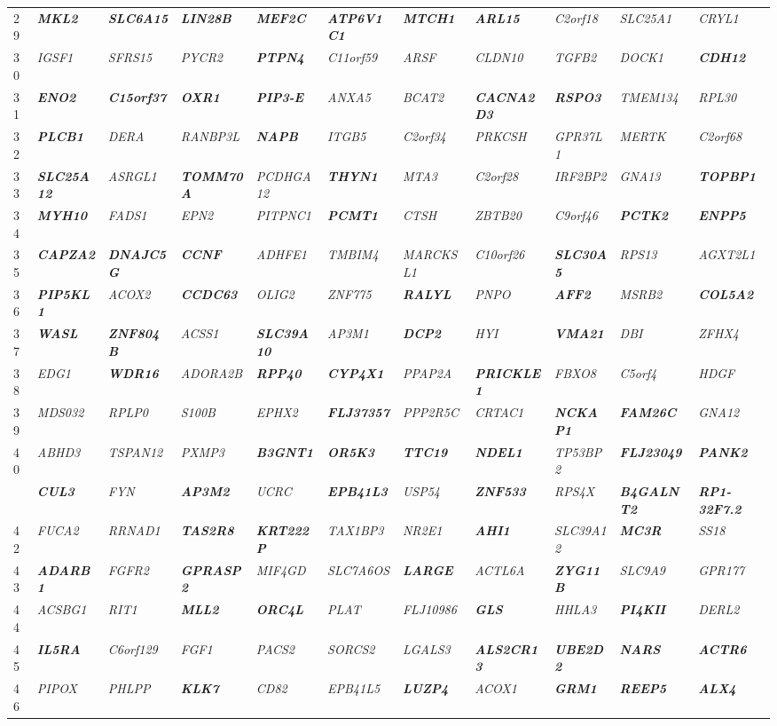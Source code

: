 \documentclass[letterpaper,12pt]{article}
\numberwithin{equation}{appendix}
\begin{document}
\begin{landscape}
{{\begin{longtable}{l >{\itshape}l >{\itshape}l >{\itshape}l >{\itshape}l >{\itshape}l >{\itshape}l >{\itshape}l >{\itshape}l >{\itshape}l >{\itshape}l}
29&{\bfseries {MKL2}}&{\bfseries {SLC6A15}}&{\bfseries {LIN28B}}&{\bfseries {MEF2C}}&{\bfseries {ATP6V1C1}}&{\bfseries {MTCH1}}&{\bfseries {ARL15}}&C2orf18&SLC25A1&CRYL1\tabularnewline
30&IGSF1&SFRS15&PYCR2&{\bfseries {PTPN4}}&C11orf59&ARSF&CLDN10&TGFB2&DOCK1&{\bfseries {CDH12}}\tabularnewline
31&{\bfseries {ENO2}}&{\bfseries {C15orf37}}&{\bfseries {OXR1}}&{\bfseries {PIP3-E}}&ANXA5&BCAT2&{\bfseries {CACNA2D3}}&{\bfseries {RSPO3}}&TMEM134&RPL30\tabularnewline
32&{\bfseries {PLCB1}}&DERA&RANBP3L&{\bfseries {NAPB}}&ITGB5&C2orf34&PRKCSH&GPR37L1&MERTK&C2orf68\tabularnewline
33&{\bfseries {SLC25A12}}&ASRGL1&{\bfseries {TOMM70A}}&PCDHGA12&{\bfseries {THYN1}}&MTA3&C2orf28&IRF2BP2&GNA13&{\bfseries {TOPBP1}}\tabularnewline
34&{\bfseries {MYH10}}&FADS1&EPN2&PITPNC1&{\bfseries {PCMT1}}&CTSH&ZBTB20&C9orf46&{\bfseries {PCTK2}}&{\bfseries {ENPP5}}\tabularnewline
35&{\bfseries {CAPZA2}}&{\bfseries {DNAJC5G}}&{\bfseries {CCNF}}&ADHFE1&TMBIM4&MARCKSL1&C10orf26&{\bfseries {SLC30A5}}&RPS13&AGXT2L1\tabularnewline
36&{\bfseries {PIP5KL1}}&ACOX2&{\bfseries {CCDC63}}&OLIG2&ZNF775&{\bfseries {RALYL}}&PNPO&{\bfseries {AFF2}}&MSRB2&{\bfseries {COL5A2}}\tabularnewline
37&{\bfseries {WASL}}&{\bfseries {ZNF804B}}&ACSS1&{\bfseries {SLC39A10}}&AP3M1&{\bfseries {DCP2}}&HYI&{\bfseries {VMA21}}&DBI&ZFHX4\tabularnewline
38&EDG1&{\bfseries {WDR16}}&ADORA2B&{\bfseries {RPP40}}&{\bfseries {CYP4X1}}&PPAP2A&{\bfseries {PRICKLE1}}&FBXO8&C5orf4&HDGF\tabularnewline
39&MDS032&RPLP0&S100B&EPHX2&{\bfseries {FLJ37357}}&PPP2R5C&CRTAC1&{\bfseries {NCKAP1}}&{\bfseries {FAM26C}}&GNA12\tabularnewline
40&ABHD3&TSPAN12&PXMP3&{\bfseries {B3GNT1}}&{\bfseries {OR5K3}}&{\bfseries {TTC19}}&{\bfseries {NDEL1}}&TP53BP2&{\bfseries {FLJ23049}}&{\bfseries {PANK2}}\tabularnewline
\newpage
41&{\bfseries {CUL3}}&FYN&{\bfseries {AP3M2}}&UCRC&{\bfseries {EPB41L3}}&USP54&{\bfseries {ZNF533}}&RPS4X&{\bfseries {B4GALNT2}}&{\bfseries {RP1-32F7.2}}\tabularnewline
42&FUCA2&RRNAD1&{\bfseries {TAS2R8}}&{\bfseries {KRT222P}}&TAX1BP3&NR2E1&{\bfseries {AHI1}}&SLC39A12&{\bfseries {MC3R}}&SS18\tabularnewline
43&{\bfseries {ADARB1}}&FGFR2&{\bfseries {GPRASP2}}&MIF4GD&SLC7A6OS&{\bfseries {LARGE}}&ACTL6A&{\bfseries {ZYG11B}}&SLC9A9&GPR177\tabularnewline
44&ACSBG1&RIT1&{\bfseries {MLL2}}&{\bfseries {ORC4L}}&PLAT&FLJ10986&{\bfseries {GLS}}&HHLA3&{\bfseries {PI4KII}}&DERL2\tabularnewline
45&{\bfseries {IL5RA}}&C6orf129&FGF1&PACS2&SORCS2&LGALS3&{\bfseries {ALS2CR13}}&{\bfseries {UBE2D2}}&{\bfseries {NARS}}&{\bfseries {ACTR6}}\tabularnewline
46&PIPOX&PHLPP&{\bfseries {KLK7}}&CD82&EPB41L5&{\bfseries {LUZP4}}&ACOX1&{\bfseries {GRM1}}&{\bfseries {REEP5}}&{\bfseries {ALX4}}\tabularnewline

\end{longtable}}}
\end{landscape}
\end{document}
